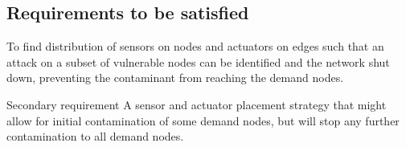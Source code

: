 \documentclass[authoryear,preprint,review,12pt]{elsarticle}
\begin{document}
\subsection{Requirements to be satisfied}
To find distribution of sensors on nodes and actuators on edges such
that an attack on a subset of vulnerable nodes can be identified and
the network shut down, preventing the contaminant
from reaching the demand nodes.

Secondary requirement %
A sensor and actuator placement strategy that might allow for initial
contamination of some demand nodes, but will stop any further contamination
to all demand nodes.




%
%
%
%


%
%
%
\end{document}
